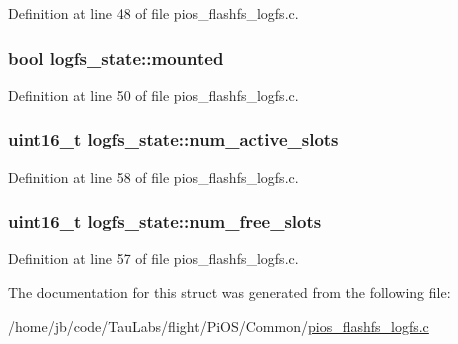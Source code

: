 \-Definition at line 48 of file pios\-\_\-flashfs\-\_\-logfs.\-c.

\hypertarget{structlogfs__state_a5d12393331e2e5d7d9141f4437e09ccf}{
\subsubsection[{mounted}]{\setlength{\rightskip}{0pt plus 5cm}bool {\bf logfs\-\_\-state\-::mounted}}}\label{structlogfs__state_a5d12393331e2e5d7d9141f4437e09ccf}


\-Definition at line 50 of file pios\-\_\-flashfs\-\_\-logfs.\-c.

\hypertarget{structlogfs__state_a9606319a5f23b1dee579106c84bf198b}{
\subsubsection[{num\-\_\-active\-\_\-slots}]{\setlength{\rightskip}{0pt plus 5cm}uint16\-\_\-t {\bf logfs\-\_\-state\-::num\-\_\-active\-\_\-slots}}}\label{structlogfs__state_a9606319a5f23b1dee579106c84bf198b}


\-Definition at line 58 of file pios\-\_\-flashfs\-\_\-logfs.\-c.

\hypertarget{structlogfs__state_a3c61a652819a886351af3431c8fe2061}{
\subsubsection[{num\-\_\-free\-\_\-slots}]{\setlength{\rightskip}{0pt plus 5cm}uint16\-\_\-t {\bf logfs\-\_\-state\-::num\-\_\-free\-\_\-slots}}}\label{structlogfs__state_a3c61a652819a886351af3431c8fe2061}


\-Definition at line 57 of file pios\-\_\-flashfs\-\_\-logfs.\-c.



\-The documentation for this struct was generated from the following file\-:\begin{DoxyCompactItemize}
\item 
/home/jb/code/\-Tau\-Labs/flight/\-Pi\-O\-S/\-Common/\hyperlink{pios__flashfs__logfs_8c}{pios\-\_\-flashfs\-\_\-logfs.\-c}\end{DoxyCompactItemize}
